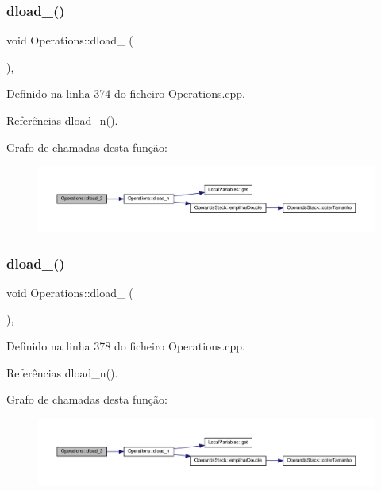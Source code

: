 \subsubsection{\texorpdfstring{dload\+\_()}{dload\_2()}}
{\footnotesize\ttfamily void Operations\+::dload\+\_ (\begin{DoxyParamCaption}{ }\end{DoxyParamCaption})\hspace{0.3cm}{\ttfamily [static]}, {\ttfamily [private]}}



Definido na linha 374 do ficheiro Operations.\+cpp.



Referências dload\+\_\+n().

Grafo de chamadas desta função\+:\nopagebreak
\begin{figure}[H]
\begin{center}
\leavevmode
\includegraphics[width=350pt]{classOperations_a55b89c1780e7f91ad7b6da5747d8c6ba_cgraph}
\end{center}
\end{figure}
\mbox{\label{classOperations_ab3a0a107f5c4a791c71b727142a69523}} 
\subsubsection{\texorpdfstring{dload\+\_()}{dload\_3()}}
{\footnotesize\ttfamily void Operations\+::dload\+\_ (\begin{DoxyParamCaption}{ }\end{DoxyParamCaption})\hspace{0.3cm}{\ttfamily [static]}, {\ttfamily [private]}}



Definido na linha 378 do ficheiro Operations.\+cpp.



Referências dload\+\_\+n().

Grafo de chamadas desta função\+:\nopagebreak
\begin{figure}[H]
\begin{center}
\leavevmode
\includegraphics[width=350pt]{classOperations_ab3a0a107f5c4a791c71b727142a69523_cgraph}
\end{center}
\end{figure}
\mbox{\label{classOperations_a44536bc4112eb4eebe23ff85e9b7d02b}} 
